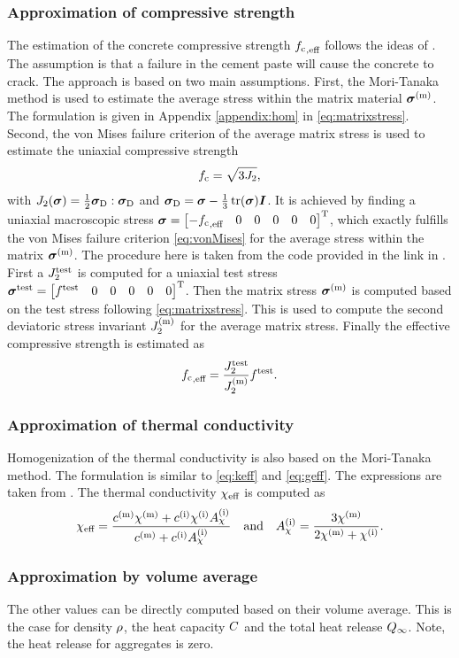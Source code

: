 \subsubsection{Approximation of compressive strength}
The estimation of the concrete compressive strength ${f_{\text{c}}}_{,\text{eff}}$ follows the ideas of \cite{nev_2018_mcam}.
The assumption is that a failure in the cement paste will cause the concrete to crack.
The approach is based on two main assumptions.
First, the Mori-Tanaka method is used to estimate the average stress within the matrix material $\boldsymbol{\sigma}^{(\text{m})}$. 
The formulation is given in Appendix \ref{appendix:hom} in \eqref{eq:matrixstress}.
Second, the von Mises failure criterion of the average matrix stress is used to estimate the uniaxial compressive strength
\begin{align}
{f_{\text{c}}} = \sqrt{3 J_2},  \label{eq:vonMises}
\end{align}
with $J_2(\boldsymbol{\sigma}) = \frac{1}{2} \boldsymbol{\sigma}_{\text{D}}:\boldsymbol{\sigma}_{\text{D}}$ and $\boldsymbol{\sigma}_{\text{D}} = \boldsymbol{\sigma} - \frac{1}{3}\operatorname{tr}(\boldsymbol{\sigma})\boldsymbol{I}$.
It is achieved by finding a uniaxial macroscopic stress $\boldsymbol{\sigma} = \begin{bmatrix} -{f_{\text{c}}}_{,\text{eff}} & 0 & 0 &0&0&0 \end{bmatrix}^\text{T}$, which exactly fulfills the von Mises failure criterion \eqref{eq:vonMises} for the average stress within the matrix $\boldsymbol{\sigma}^{(\text{m})}$.
The procedure here is taken from the code provided in the link in \cite{nee_2012_ammf}.
First a $J_2^{\text{test}}$ is computed for a uniaxial test stress $\boldsymbol{\sigma}^{\text{test}} = \begin{bmatrix} f^{\text{test}} & 0 & 0 &0&0&0 \end{bmatrix}^\text{T}$. 
Then the matrix stress $\boldsymbol{\sigma}^{(\text{m})}$ is computed based on the test stress following \eqref{eq:matrixstress}. 
This is used to compute the second deviatoric stress invariant $J_2^{(\text{m})}$ for the average matrix stress.
Finally the effective compressive strength is estimated as
\begin{align}
	{f_{\text{c}}}_{,\text{eff}} = \frac{J_2^{\text{test}}}{J_2^{(\text{m})}} f^{\text{test}}.
\end{align}
\subsubsection{Approximation of thermal conductivity }
Homogenization of the thermal conductivity is also based on the Mori-Tanaka method.
The formulation is similar to \eqref{eq:keff} and \eqref{eq:geff}.
The expressions are taken from \cite{str_2011_mbeo}.
The thermal conductivity $\chi_{\text{eff}}$ is computed as
\begin{align}
	\chi_{\text{eff}} = \dfrac{c^{(\text{m})}\chi^{(\text{m})} + c^{(\text{i})} \chi^{(\text{i})} A_{\chi}^{(\text{i})}}{c^{(\text{m})} +  c^{(\text{i})} A_{\chi}^{(\text{i})}}\quad\text{and}\quad
	A_{\chi}^{(\text{i})} = \frac{3\chi^{(\text{m})}}{2\chi^{(\text{m})}+\chi^{(\text{i})}}.
\end{align}
\subsubsection{Approximation by volume average}
The other values can be directly computed based on their volume average.
This is the case for density $\rho$, the heat capacity $C$ and the total heat release $Q_{\infty}$.
Note, the heat release for aggregates is zero.


